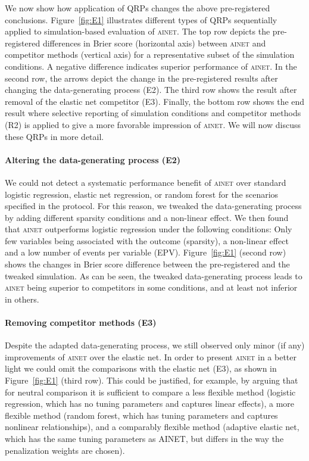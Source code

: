 \documentclass[a4paper, 11pt]{article}
\newcommand{\ainet}{\textsc{ainet}}
\begin{document}
We now show how application of QRPs changes the above pre-registered conclusions.
Figure~\ref{fig:E1} illustrates different types of QRPs sequentially applied
to simulation-based evaluation of \ainet{}. The top row depicts the
pre-registered differences in Brier score (horizontal axis) between \ainet{} and
competitor methods (vertical axis) for a representative subset of the simulation
conditions. A negative difference indicates superior performance of \ainet{}.
In the second row, the arrows depict the change in the pre-registered
results after changing the data-generating process (E2).
The third row shows the result after removal of the elastic net competitor
(E3). Finally, the bottom row shows the end result where selective reporting
of simulation conditions and competitor methods (R2) is applied to give
a more favorable impression of \ainet{}.
We will now discuss these QRPs in more detail.

\paragraph{Altering the data-generating process (E2)}
We could not detect a systematic performance benefit
of \ainet{} over standard logistic regression, elastic net regression, or
random forest for the scenarios specified in the protocol. For this reason,
we tweaked the data-generating process by adding different sparsity conditions and a
non-linear effect. We then found that
\ainet{} outperforms logistic regression under the following conditions:
Only few variables being associated with the
outcome (sparsity), a non-linear effect and a low number of events per
variable (EPV). Figure~\ref{fig:E1} (second row) shows the changes in Brier score
difference between the pre-registered and the tweaked simulation. As can be seen, the
tweaked data-generating process leads to \ainet{} being superior to competitors
in some conditions, and at least not inferior in others.

\paragraph{Removing competitor methods (E3)}
Despite the adapted data-generating process, we still observed only minor (if any)
improvements of \ainet{} over the elastic net. In order to present \ainet{}
in a better light we could omit the comparisons with the elastic net (E3),
as shown in Figure~\ref{fig:E1} (third row). This could be justified, for example,
by arguing that for neutral comparison it is sufficient to compare a less flexible
method (logistic regression, which has no tuning parameters and captures linear
effects), a more flexible method (random forest, which has tuning parameters and
captures nonlinear relationships), and a comparably flexible method (adaptive
elastic net, which has the same tuning parameters as AINET, but differs in the
way the penalization weights are chosen).
\end{document}
